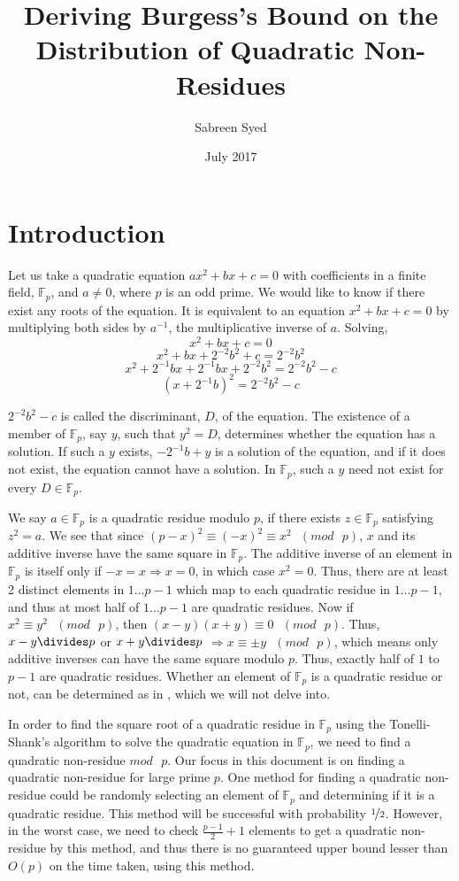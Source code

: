 \documentclass{article}
\title{Deriving Burgess's Bound on the Distribution of Quadratic Non-Residues}
\author{
  Sabreen Syed\\
  \multicolumn{1}{p{.7\textwidth}}{\centering\emph{Department of Computer Science and Engineering\\
  Indian Institute of Technology Kanpur, India}}}
\date{July 2017}
\begin{document}
\maketitle

\section{Introduction}
Let us take a quadratic equation $ax^2+bx+c=0$ with coefficients in a finite field, $\mathbb{F}_p$, and $a\neq0$, where $p$ is an odd prime. We would like to know if there exist any roots of the equation. It is equivalent to an equation $x^2+bx+c=0$ by multiplying both sides by $a^{-1}$, the multiplicative inverse of $a$. Solving,
$$x^2+bx+c=0$$
$$x^2+bx+2^{-2}b^{2}+c=2^{-2}b^{2}$$
$$x^2+2^{-1}bx+2^{-1}bx+2^{-2}b^{2}=2^{-2}b^{2}-c$$
$$(x+2^{-1}b)^2=2^{-2}b^{2}-c$$

$2^{-2}b^{2}-c$ is called the discriminant, $D$, of the equation. The existence of a member of $\mathbb{F}_p$, say $y$, such that $y^2=D$, determines whether the equation has a solution. If such a $y$ exists, $-2^{-1}b+y$ is a solution of the equation, and if it does not exist, the equation cannot have a solution. In $\mathbb{F}_p$, such a $y$ need not exist for every $D\in\mathbb{F}_p$.

We say $a\in\mathbb{F}_p$ is a quadratic residue modulo $p$, if there exists $z\in \mathbb{F}_p$ satisfying $z^2=a$. We see that since $(p-x)^2\equiv(-x)^2\equiv x^2\textrm{  }(mod\textrm{ }p)$, $x$ and its additive inverse have the same square in $\mathbb{F}_p$. The additive inverse of an element in $\mathbb{F}_p$ is itself only if $-x=x \Rightarrow x=0$, in which case $x^2=0$. Thus, there are at least 2 distinct elements in $1\ldots p-1$ which map to each quadratic residue in $1\ldots p-1$, and thus at most half of $1\ldots p-1$ are quadratic residues. Now if $x^2\equiv y^2 \textrm{ }(mod\textrm{ } p)$, then $(x-y)(x+y)\equiv 0\textrm{ }(mod\textrm{ } p)$. Thus, $x-y\divides p$ or $x+y\divides p$ $\Rightarrow x\equiv \pm y \textrm{ } (mod\textrm{ } p)$, which means only additive inverses can have the same square modulo $p$. Thus, exactly half of $1$ to $p-1$ are quadratic residues. Whether an element of $\mathbb{F}_p$ is a quadratic residue or not, can be determined as in \cite{burton}, which we will not delve into.

In order to find the square root of a quadratic residue in $\mathbb{F}_p$ using the Tonelli-Shank's algorithm \cite{tonelli} to solve the quadratic equation in $\mathbb{F}_p$, we need to find a quadratic non-residue $mod\text{ }p$. Our focus in this document is on finding a quadratic non-residue for large prime $p$. One method for finding a quadratic non-residue could be randomly selecting an element of $\mathbb{F}_p$ and determining if it is a quadratic residue. This method will be successful with probability $\nicefrac{1}{2}$. However, in the worst case, we need to check $\frac{p-1}{2}+1$ elements to get a quadratic non-residue by this method, and thus there is no guaranteed upper bound lesser than $O(p)$ on the time taken, using this method.
 
\end{document}

